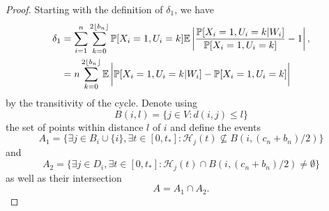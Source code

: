 	\begin{proof}
	Starting with the definition of $\delta_1$, we have
		\begin{align}
			\delta_1 &= %
			\sum_{i = 1}^n \sum_{k = 0}^{2 \lfloor b_n\rfloor} \prob[X_i = 1, U_i = k] \expect \left| \frac{\prob[X_i = 1, U_i = k|W_i]}{\prob[X_i = 1, U_i = k]} - 1 \right|,\\
			&= n \sum_{k = 0}^{2 \lfloor b_n\rfloor} \expect \left|\vphantom{\frac{1}{2}}\prob[X_i = 1, U_i = k|W_i] - \prob[X_i = 1, U_i = k] \right|%
			\label{eq: delta1 line 2}
		\end{align}
		by the transitivity of the cycle.
		Denote using
		\begin{equation}
			B(i, l) = \{j \in V : d(i, j) \leq l\}
		\end{equation}
		the set of points within distance $l$ of $i$ and
		define the events
		\begin{equation}
			A_1 = \{\exists j \in B_i \cup \{i\}, \exists t \in [0, t_*] : \mathcal{H}_j(t) \nsubseteq  B(i, (c_n + b_n)/2)\}
		\end{equation}
		and
		\begin{equation}
			A_2 = \{\exists j \in D_i, \exists t \in [0, t_*] : \mathcal{H}_j(t) \cap B(i, (c_n + b_n)/2) \neq \emptyset\}
		\end{equation}
		as well as their intersection
		\begin{equation}
			A = A_1 \cap A_2.
		\end{equation}


\end{proof}
